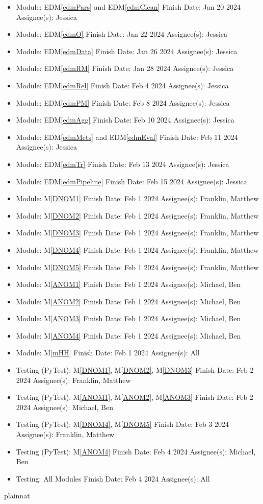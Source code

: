 \documentclass[12pt, titlepage]{article}
\newcommand{\mref}[1]{M\ref{#1}}
\newcommand{\edmref}[1]{EDM\ref{#1}}
\begin{document}
\begin{itemize}
    \item Module: \edmref{edmPars} and \edmref{edmClean} Finish Date: Jan 20 2024 Assignee(s): Jessica
    \item Module: \edmref{edmO} Finish Date: Jan 22 2024 Assignee(s): Jessica
    \item Module: \edmref{edmData} Finish Date: Jan 26 2024 Assignee(s): Jessica
    \item Module: \edmref{edmRM} Finish Date: Jan 28 2024 Assignee(s): Jessica
    \item Module: \edmref{edmRel} Finish Date: Feb 4 2024 Assignee(s): Jessica
    \item Module: \edmref{edmPM} Finish Date: Feb 8 2024 Assignee(s): Jessica
    \item Module: \edmref{edmAgg} Finish Date: Feb 10 2024 Assignee(s): Jessica
    \item Module: \edmref{edmMets} and \edmref{edmEval} Finish Date: Feb 11 2024 Assignee(s): Jessica
    \item Module: \edmref{edmTr} Finish Date: Feb 13 2024 Assignee(s): Jessica
    \item Module: \edmref{edmPipeline} Finish Date: Feb 15 2024 Assignee(s): Jessica
    \item Module: \mref{DNOM1} Finish Date: Feb 1 2024 Assignee(s): Franklin, Matthew
    \item Module: \mref{DNOM2} Finish Date: Feb 1 2024 Assignee(s): Franklin, Matthew
    \item Module: \mref{DNOM3} Finish Date: Feb 1 2024 Assignee(s): Franklin, Matthew
    \item Module: \mref{DNOM4} Finish Date: Feb 1 2024 Assignee(s): Franklin, Matthew
    \item Module: \mref{DNOM5} Finish Date: Feb 1 2024 Assignee(s): Franklin, Matthew
    \item Module: \mref{ANOM1} Finish Date: Feb 1 2024 Assignee(s): Michael, Ben
    \item Module: \mref{ANOM2} Finish Date: Feb 1 2024 Assignee(s): Michael, Ben
    \item Module: \mref{ANOM3} Finish Date: Feb 1 2024 Assignee(s): Michael, Ben
    \item Module: \mref{ANOM4} Finish Date: Feb 1 2024 Assignee(s): Michael, Ben
    \item Module: \mref{mHH} Finish Date: Feb 1 2024 Assignee(s): All
    \item Testing (PyTest): \mref{DNOM1}, \mref{DNOM2}, \mref{DNOM3} Finish Date: Feb 2 2024 Assignee(s): Franklin, Matthew
    \item Testing (PyTest): \mref{ANOM1}, \mref{ANOM2}, \mref{ANOM3} Finish Date: Feb 2 2024 Assignee(s): Michael, Ben
    \item Testing (PyTest): \mref{DNOM4}, \mref{DNOM5} Finish Date: Feb 3 2024 Assignee(s): Franklin, Matthew
    \item Testing (PyTest): \mref{ANOM4} Finish Date: Feb 4 2024 Assignee(s): Michael, Ben
    \item Testing: All Modules Finish Date: Feb 4 2024 Assignee(s): All
\end{itemize}


 {plainnat}


\newpage{}
\end{document}
